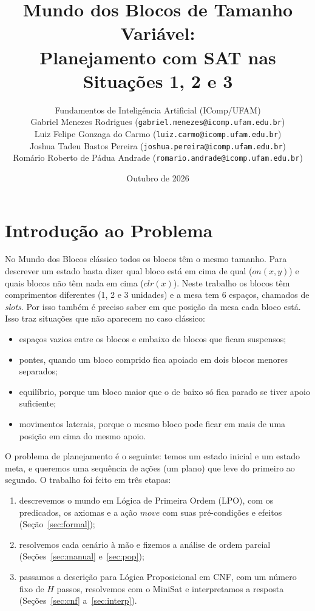 \documentclass[11pt,a4paper]{article}
\title{Mundo dos Blocos de Tamanho Variável:\\
Planejamento com SAT nas Situações 1, 2 e 3}
\author{Fundamentos de Inteligência Artificial (IComp/UFAM)\\[1.5ex]
\normalsize Gabriel Menezes Rodrigues (\texttt{gabriel.menezes@icomp.ufam.edu.br})\\
\normalsize Luiz Felipe Gonzaga do Carmo (\texttt{luiz.carmo@icomp.ufam.edu.br})\\
\normalsize Joshua Tadeu Bastos Pereira (\texttt{joshua.pereira@icomp.ufam.edu.br})\\
\normalsize Romário Roberto de Pádua Andrade (\texttt{romario.andrade@icomp.ufam.edu.br})}
\date{Outubro de 2026}
\newcommand{\clr}{\mathit{clr}}
\newcommand{\on}{\mathit{on}}
\newcommand{\mv}{\mathit{move}}
\begin{document}
\maketitle
\tableofcontents

\section{Introdução ao Problema}
No Mundo dos Blocos clássico todos os blocos têm o mesmo tamanho. Para descrever
um estado basta dizer qual bloco está em cima de qual ($\on(x,y)$) e quais blocos
não têm nada em cima ($\clr(x)$). Neste trabalho os blocos têm comprimentos
diferentes (1, 2 e 3 unidades) e a mesa tem 6 espaços, chamados de \emph{slots}.
Por isso também é preciso saber em que posição da mesa cada bloco está. Isso traz
situações que não aparecem no caso clássico:
\begin{itemize}
  \item espaços vazios entre os blocos e embaixo de blocos que ficam suspensos;
  \item pontes, quando um bloco comprido fica apoiado em dois blocos menores
        separados;
  \item equilíbrio, porque um bloco maior que o de baixo só fica parado se tiver
        apoio suficiente;
  \item movimentos laterais, porque o mesmo bloco pode ficar em mais de uma posição
        em cima do mesmo apoio.
\end{itemize}

O problema de planejamento é o seguinte: temos um estado inicial e um estado meta,
e queremos uma sequência de ações (um plano) que leve do primeiro ao segundo. O
trabalho foi feito em três etapas:
\begin{enumerate}
  \item descrevemos o mundo em Lógica de Primeira Ordem (LPO), com os predicados,
        os axiomas e a ação $\mv$ com suas pré-condições e efeitos
        (Seção~\ref{sec:formal});
  \item resolvemos cada cenário à mão e fizemos a análise de ordem parcial
        (Seções~\ref{sec:manual} e~\ref{sec:pop});
  \item passamos a descrição para Lógica Proposicional em CNF, com um número fixo
        de $H$ passos, resolvemos com o MiniSat e interpretamos a resposta
        (Seções~\ref{sec:cnf} a~\ref{sec:interp}).
\end{enumerate}
\end{document}
